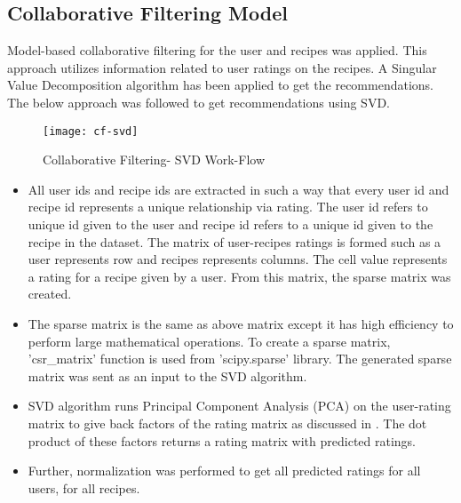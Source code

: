 \subsection{Collaborative Filtering Model}
\label{sec:cf}
Model-based collaborative filtering for the user and recipes was applied. This approach utilizes information related to user ratings on the recipes. A Singular Value Decomposition algorithm has been applied to get the recommendations. The below approach was followed to get recommendations using SVD.
\begin{singlespace}
\begin{figure}[H]
	\centering
	\texttt{[image: cf-svd]}
	\caption{Collaborative Filtering- SVD Work-Flow }
	\label{fig:cf-svd}
\end{figure}  
\end{singlespace}

\begin{itemize}
\item All user ids and recipe ids are extracted in such a way that every user id and recipe id represents a unique relationship via rating. The user id refers to unique id given to the user and recipe id refers to a unique id given to the recipe in the dataset. The matrix of user-recipes ratings is formed such as a user represents row and recipes represents columns. The cell value represents a rating for a recipe given by a user. From this matrix, the sparse matrix was created. 
\item The sparse matrix is the same as above matrix except it has high efficiency to perform large mathematical operations. To create a sparse matrix, 'csr\_matrix' function is used from 'scipy.sparse' library. The generated sparse matrix was sent as an input to the SVD algorithm.
\item SVD algorithm runs Principal Component Analysis (PCA) on the user-rating matrix to give back factors of the rating matrix as discussed in . The dot product of these factors returns a rating matrix with predicted ratings. 
\item Further, normalization was performed to get all predicted ratings for all users, for all recipes.
\end{itemize}

